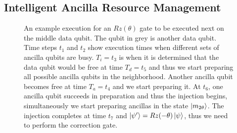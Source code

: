 \subsection{Intelligent Ancilla Resource Management}\label{section:ancillamanage}
\begin{figure}
    \centering
    
    \caption{An example execution for an $Rz(\theta)$ gate to be executed next on the middle data qubit. The qubit in grey is another data qubit. Time steps $t_1$ and $t_2$ show execution times when different sets of ancilla qubits are busy. $T_i = t_3$ is when it is determined that the data qubit would be free at time $T_d = t_5$ and thus we start preparing all possible ancilla qubits in the neighborhood. Another ancilla qubit becomes free at time $T_a = t_4$ and we start preparing it. At $t_6$, one ancilla qubit succeeds in preparation and thus the injection begins, simultaneously we start preparing ancillas in the state $\ket{m_{2\theta}}$. The injection completes at time $t_7$ and $\ket{\psi'} = Rz(-\theta)\ket{\psi}$, thus we need to perform the correction gate.}
    \label{fig:prepare_timeline}
\end{figure}

